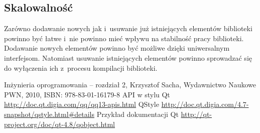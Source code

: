 \documentclass[11pt,twoside,a4paper,final]{article}
\begin{document}
\subsection{Skalowalność}
Zarówno dodawanie nowych jak i~usuwanie już istniejących elementów biblioteki powinno być łatwe i~nie powinno mieć wpływu na stabilność pracy biblioteki. Dodawanie nowych elementów powinno być możliwe dzięki uniwersalnym interfejsom. Natomiast usuwanie istniejących elementów powinno sprowadzać się do wyłączenia ich z~procesu kompilacji biblioteki.

\begin{thebibliography}{}
Inżynieria oprogramowania -- rozdział 2, Krzysztof Sacha, Wydawnictwo Naukowe PWN, 2010, ISBN: 978-83-01-16179-8
API w stylu Qt \url{http://doc.qt.digia.com/qq/qq13-apis.html}
QStyle \url{http://doc.qt.digia.com/4.7-snapshot/qstyle.html#details}
Przykład dokumentacji Qt \url{http://qt-project.org/doc/qt-4.8/qobject.html}

\end{thebibliography}
\end{document}
